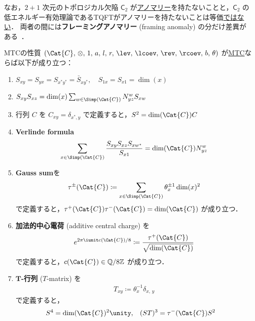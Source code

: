\documentclass[TQFT_main]{subfiles}
\begin{document}
なお，$2+1$ 次元のトポロジカル欠陥 $\mathsf{C}_2$ が\hyperref[def:anomalousQP]{アノマリー}を持たないことと，$\mathsf{C}_2$ の低エネルギー有効理論であるTQFTがアノマリーを持たないことは等価\underline{ではない}．
両者の間には\textbf{フレーミングアノマリー} (framing anomaly) の分だけ差異がある~\cite{turaev2010quantum}．

\begin{myprop}[label=prop:MTC]{MTCの性質}
    $(\Cat{C},\, \otimes,\, 1,\, a,\, l,\, r,\, \lev,\, \lcoev,\, \rev,\, \rcoev,\, b,\, \theta)$ が\hyperref[def:MTC]{MTC}ならば以下が成り立つ：
    \begin{enumerate}
        \item $S_{xy} = S_{yx} = S_{x^*y^*} = \bar{S}_{xy^*},\quad S_{1x} = S_{x1} = \dim (x)$
        \item $S_{xy} S_{xz} = \dim(x) \sum_{w \in \Simp(\Cat{C})} N^w_{yz} S_{xw}$
        \item 行列 $C$ を $C_{xy} = \delta_{x^*,y}$ で定義すると，$S^2 = \dim(\Cat{C}) C$
        \item \textbf{Verlinde formula}
        \begin{align}
            \sum_{x \in \Simp(\Cat{C})} \frac{S_{xy} S_{xz} S_{xw^*}}{S_{x1}} = \dim(\Cat{C}) N^w_{yz}
        \end{align}
        \item \textbf{Gauss sum}を
        \begin{align}
            \tau^{\pm} (\Cat{C}) \coloneqq \sum_{x \in \Simp(\Cat{C})} \theta_x^{\pm 1} \dim (x)^2
        \end{align}
        で定義すると，$\tau^+(\Cat{C}) \tau^-(\Cat{C}) = \dim (\Cat{C})$ が成り立つ．
        \item \textbf{加法的中心電荷} (additive central charge) を
        \begin{align}
            e^{2\pi \iunit c(\Cat{C})/8} \coloneqq \frac{\tau^+(\Cat{C})}{\sqrt{\dim (\Cat{C})}}
        \end{align}
        で定義すると，$c(\Cat{C}) \in \mathbb{Q} / 8 \mathbb{Z}$ が成り立つ．
        \item \textbf{$\bm{T}$-行列} ($T$-matrix) を
        \begin{align}
            T_{xy} \coloneqq \theta_x^{-1} \delta_{x,\, y}
        \end{align}
        で定義すると，
        \begin{align}
            S^4 &= \dim(\Cat{C})^2 \unity, & (ST)^3 &= \tau^-(\Cat{C}) S^2
        \end{align}

\end{enumerate}
\end{myprop}
\end{document}
